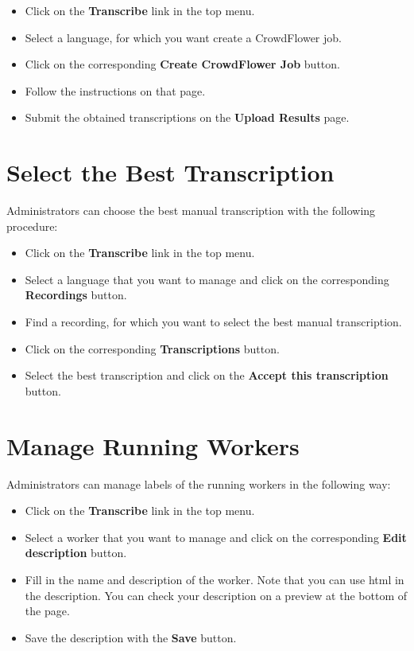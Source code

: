     \begin{itemize}
	\item Click on the \textbf{Transcribe} link in the top menu.
	\item Select a language, for which you want create a CrowdFlower job.
	\item Click on the corresponding \textbf{Create CrowdFlower Job} button.
	\item Follow the instructions on that page.
	\item Submit the obtained transcriptions on the \textbf{Upload Results} page.
    \end{itemize}

\section{Select the Best Transcription}
    Administrators can choose the best manual transcription with the following procedure:

    \begin{itemize}
	\item Click on the \textbf{Transcribe} link in the top menu.
	\item Select a language that you want to manage and click on the corresponding \textbf{Recordings} button.
	\item Find a recording, for which you want to select the best manual transcription.
	\item Click on the corresponding \textbf{Transcriptions} button.
	\item Select the best transcription and click on the \textbf{Accept this transcription} button.
    \end{itemize}


\section{Manage Running Workers}
    Administrators can manage labels of the running workers in the following way:

    \begin{itemize}
	\item Click on the \textbf{Transcribe} link in the top menu.
	\item Select a worker that you want to manage and click on the corresponding \textbf{Edit description} button.
	\item
	    Fill in the name and description of the worker.
	    Note that you can use html in the description.
	    You can check your description on a preview at the bottom of the page.
	\item Save the description with the \textbf{Save} button.
    \end{itemize}
